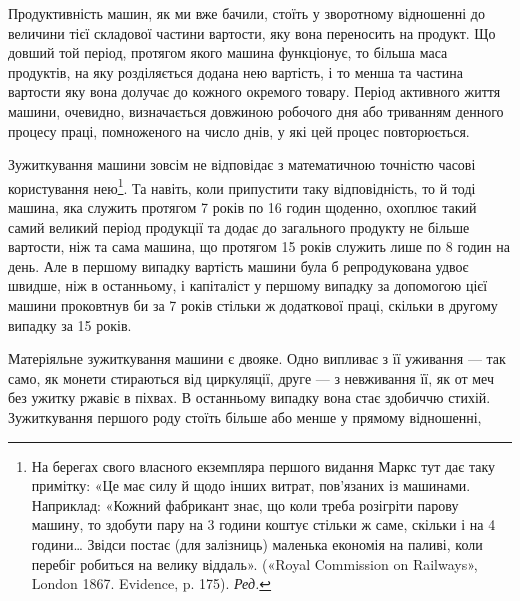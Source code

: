 Продуктивність машин, як ми вже бачили, стоїть у зворотному
відношенні до величини тієї складової частини вартости, яку вона
переносить на продукт. Що довший той період, протягом якого
машина функціонує, то більша маса продуктів, на яку розділяється
додана нею вартість, і то менша та частина вартости
яку вона долучає до кожного окремого товару. Період активного
життя машини, очевидно, визначається довжиною робочого дня
або триванням денного процесу праці, помноженого на число
днів, у які цей процес повторюється.

Зужиткування машини зовсім не відповідає з математичною
точністю часові користування нею\footnote*{
На берегах свого власного екземпляра першого видання Маркс
тут дає таку примітку: «Це має силу й щодо інших витрат, пов’язаних із
машинами. Наприклад: «Кожний фабрикант знає, що коли треба розігріти
парову машину, то здобути пару на 3 години коштує стільки ж саме,
скільки і на 4 години\dots{} Звідси постає (для залізниць) маленька економія
на паливі, коли перебіг робиться на велику віддаль». («Royal Commission
on Railways», London 1867. Evidence, p. 175). \emph{Ред.}
}. Та навіть, коли припустити
таку відповідність, то й тоді машина, яка служить протягом
7 років по 16 годин щоденно, охоплює такий самий великий
період продукції та додає до загального продукту не більше
вартости, ніж та сама машина, що протягом 15 років служить
лише по 8 годин на день. Але в першому випадку вартість машини
була б репродукована удвоє швидше, ніж в останньому, і капіталіст
у першому випадку за допомогою цієї машини проковтнув би
за 7  років стільки ж додаткової праці, скільки в другому випадку
за 15 років.

Матеріяльне зужиткування машини є двояке. Одно випливає
з її уживання — так само, як монети стираються від циркуляції,
друге — з невживання її, як от меч без ужитку ржавіє в піхвах.
В останньому випадку вона стає здобиччю стихій. Зужиткування
першого роду стоїть більше або менше у прямому відношенні,
\parbreak{}  %
